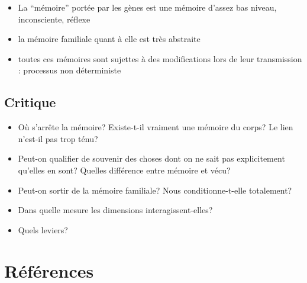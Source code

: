 \documentclass[french]{article}
\begin{document}
			
		\begin{itemize}
			\item La ``mémoire'' portée par les gènes est une mémoire d'assez bas niveau, inconsciente, réflexe
			\item la mémoire familiale quant à elle est très abstraite
			\item toutes ces mémoires sont sujettes à des modifications lors de leur transmission : processus non déterministe
		\end{itemize}
		\subsection{Critique}
		\begin{itemize}
			\item Où s'arrête la mémoire? Existe-t-il vraiment une mémoire du corps? Le lien n'est-il pas trop ténu?
			\item Peut-on qualifier de souvenir des choses dont on ne sait pas explicitement qu'elles en sont? Quelles différence entre mémoire et vécu?
			\item Peut-on sortir de la mémoire familiale? Nous conditionne-t-elle totalement?
			\item Dans quelle mesure les dimensions interagissent-elles?
			\item Quels leviers?
		\end{itemize}
	\newpage
	\section*{Références}
	\printbibliography[heading=main, keyword=main]
	\printbibliography[heading=minor, keyword=minor]
	\nocite{*}
\end{document}

